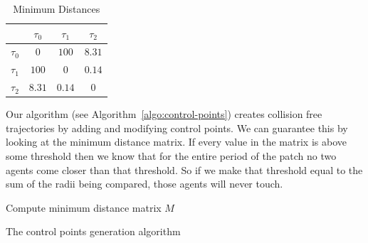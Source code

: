 \begin{table}[t]
	\centering
	\caption{Minimum Distances}
	\begin{tabular}{|c||c|c|c|}
		\hline
		 & $\tau_0$	& $\tau_1$ & $\tau_2$\\ \hline \hline
		$\tau_0$	& $0$		&	$100$ & $8.31$\\  \hline
		$\tau_1$	& $100$		&	$0$ & $0.14$\\  \hline
		$\tau_2$	& $8.31$		&	$0.14$ & $0$\\
		\hline
		\end{tabular}
\label{tab:minimum-distances}
\end{table}


Our algorithm (see Algorithm~\ref{algo:control-points}) creates collision free trajectories by adding and modifying control points. We can guarantee this by looking at the minimum distance matrix. If every value in the matrix is above some threshold then we know that for the entire period of the patch no two agents come closer than that threshold. So if we make that threshold equal to the sum of the radii being compared, those agents will never touch.


\begin{algorithm}[t]
Compute minimum distance matrix $M$\;
\caption{The control points generation algorithm}
\label{algo:control-points}
\end{algorithm}


